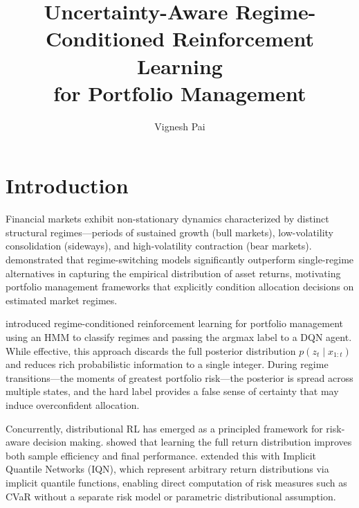 \documentclass[sigconf,nonacm]{acmart}
\title{Uncertainty-Aware Regime-Conditioned Reinforcement Learning\\
       for Portfolio Management}
\author{Vignesh Pai}
\affiliation{%
  \institution{Oakland University}
  \department{Department of Electrical and Computer Engineering}
  \city{Rochester}
  \state{Michigan}
  \country{USA}
}
\newcommand{\post}{p(z_t \mid x_{1:t})}
\begin{document}
\maketitle

\section{Introduction}
\label{sec:intro}

Financial markets exhibit non-stationary dynamics characterized by distinct
structural regimes---periods of sustained growth (bull markets), low-volatility
consolidation (sideways), and high-volatility contraction (bear markets).
\citet{ang2002} demonstrated that regime-switching models significantly
outperform single-regime alternatives in capturing the empirical distribution of
asset returns, motivating portfolio management frameworks that explicitly
condition allocation decisions on estimated market regimes.

\citet{almahdi2019} introduced regime-conditioned reinforcement learning for
portfolio management using an HMM to classify regimes and passing the argmax
label to a DQN agent.
While effective, this approach discards the full posterior distribution
$\post$ and reduces rich probabilistic information to a single integer.
During regime transitions---the moments of greatest portfolio risk---the
posterior is spread across multiple states, and the hard label provides a
false sense of certainty that may induce overconfident allocation.

Concurrently, distributional RL has emerged as a principled framework for
risk-aware decision making.
\citet{bellemare2017} showed that learning the full return distribution improves
both sample efficiency and final performance.
\citet{dabney2018iqn} extended this with Implicit Quantile Networks (IQN),
which represent arbitrary return distributions via implicit quantile functions,
enabling direct computation of risk measures such as CVaR without a separate
risk model or parametric distributional assumption.
\end{document}
